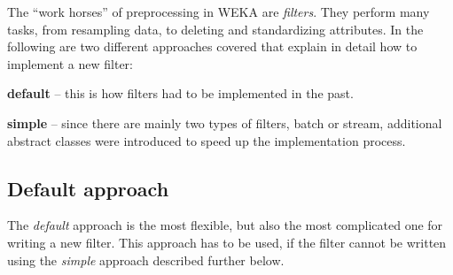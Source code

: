 %
%
%
%


The ``work horses'' of preprocessing in WEKA are \textit{filters}. They perform
many tasks, from resampling data, to deleting and standardizing attributes. In
the following are two different approaches covered that explain in detail how
to implement a new filter:
\begin{tight_itemize}
  \item \textbf{default} -- this is how filters had to be implemented in the
past.
  \item \textbf{simple }-- since there are mainly two types of filters, batch or
stream, additional abstract classes were introduced to speed up
the implementation process.
\end{tight_itemize}

\subsection{Default approach}
The \textit{default} approach is the most flexible, but also the most 
complicated one for writing a new filter. This approach has to be used, if the
filter cannot be written using the \textit{simple} approach described further
below.

